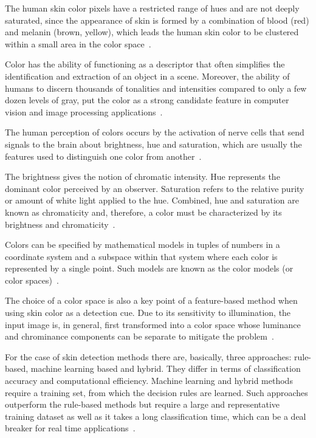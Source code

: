 The human skin color pixels have a restricted range of hues and are not deeply saturated, since the appearance of skin is formed by a combination of blood (red) and melanin (brown, yellow), which leads the human skin color to be clustered within a small area in the color space~\citep{fleck:96}.

Color has the ability of functioning as a descriptor that often simplifies the identification and extraction of an object in a scene. Moreover, the ability of humans to discern thousands of tonalities and intensities compared to only a few dozen levels of gray, put the color as a strong candidate feature in computer vision and image processing applications~\citep{gonzalez:02}.

The human perception of colors occurs by the activation of nerve cells that send signals to the brain about brightness, hue and saturation, which are usually the features used to distinguish one color from another~\citep{gonzalez:02}.

The brightness gives the notion of chromatic intensity. Hue represents the dominant color perceived by an observer. Saturation refers to the relative purity or amount of white light applied to the hue. Combined, hue and saturation are known as chromaticity and, therefore, a color must be characterized by its brightness and chromaticity~\citep{gonzalez:02}.

Colors can be specified by mathematical models in tuples of numbers in a coordinate system and a subspace within that system where each color is represented by a single point. Such models are known as the color models (or color spaces)~\citep{gonzalez:02}.

The choice of a color space is also a key point of a feature-based method when using skin color as a detection cue. Due to its sensitivity to illumination, the input image is, in general, first transformed into a color space whose luminance and chrominance components can be separate to mitigate the problem~\citep{vezhnevets:03}.

For the case of skin detection methods there are, basically, three approaches: rule-based, machine learning based and hybrid. They differ in terms of classification accuracy and computational efficiency. Machine learning and hybrid methods require a training set, from which the decision rules are learned. Such approaches outperform the rule-based methods but require a large and representative training dataset as well as it takes a long classification time, which can be a deal breaker for real time applications~\citep{kakumanu:07}.

